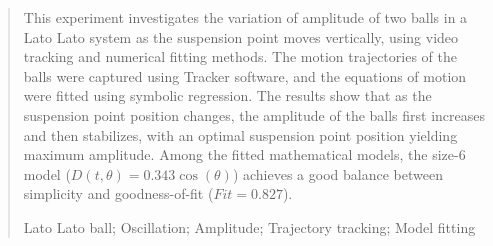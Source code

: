 \documentclass[12pt,a4paper]{article}
\begin{document}
\begin{quote}
    \fontsize{9}{10.8}\selectfont
    \setlength{\leftskip}{2em}
    \setlength{\rightskip}{2em}

     This experiment investigates the variation of amplitude of two balls in a Lato Lato system as the suspension point moves vertically, using video tracking and numerical fitting methods. The motion trajectories of the balls were captured using Tracker software, and the equations of motion were fitted using symbolic regression. The results show that as the suspension point position changes, the amplitude of the balls first increases and then stabilizes, with an optimal suspension point position yielding maximum amplitude. Among the fitted mathematical models, the size-6 model ($D(t, \theta) = 0.343 \cos(\theta)$) achieves a good balance between simplicity and goodness-of-fit ($Fit=0.827$).

    \vspace{0.5\baselineskip}
     Lato Lato ball; Oscillation; Amplitude; Trajectory tracking; Model fitting
\end{quote}

\vspace{1cm}
\end{document}
